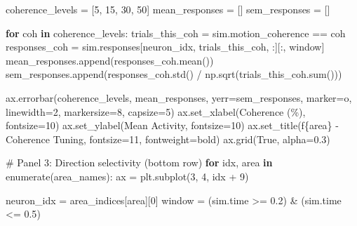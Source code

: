 \documentclass[
  11pt,
  letterpaper,
  oneside,
  openany]{book}
\newenvironment{Shaded}{\begin{snugshade}}{\end{snugshade}}
\newcommand{\BuiltInTok}[1]{\textcolor[rgb]{0.00,0.23,0.31}{#1}}
\newcommand{\CommentTok}[1]{\textcolor[rgb]{0.37,0.37,0.37}{#1}}
\newcommand{\ControlFlowTok}[1]{\textcolor[rgb]{0.00,0.23,0.31}{\textbf{#1}}}
\newcommand{\DecValTok}[1]{\textcolor[rgb]{0.68,0.00,0.00}{#1}}
\newcommand{\FloatTok}[1]{\textcolor[rgb]{0.68,0.00,0.00}{#1}}
\newcommand{\KeywordTok}[1]{\textcolor[rgb]{0.00,0.23,0.31}{\textbf{#1}}}
\newcommand{\NormalTok}[1]{\textcolor[rgb]{0.00,0.23,0.31}{#1}}
\newcommand{\OperatorTok}[1]{\textcolor[rgb]{0.37,0.37,0.37}{#1}}
\newcommand{\SpecialCharTok}[1]{\textcolor[rgb]{0.37,0.37,0.37}{#1}}
\newcommand{\SpecialStringTok}[1]{\textcolor[rgb]{0.13,0.47,0.30}{#1}}
\newcommand{\StringTok}[1]{\textcolor[rgb]{0.13,0.47,0.30}{#1}}
\newcommand{\VariableTok}[1]{\textcolor[rgb]{0.07,0.07,0.07}{#1}}
\begin{document}
\begin{Shaded}
\begin{Highlighting}[]
\NormalTok{    coherence\_levels }\OperatorTok{=}\NormalTok{ [}\DecValTok{5}\NormalTok{, }\DecValTok{15}\NormalTok{, }\DecValTok{30}\NormalTok{, }\DecValTok{50}\NormalTok{]}
\NormalTok{    mean\_responses }\OperatorTok{=}\NormalTok{ []}
\NormalTok{    sem\_responses }\OperatorTok{=}\NormalTok{ []}
    
    \ControlFlowTok{for}\NormalTok{ coh }\KeywordTok{in}\NormalTok{ coherence\_levels:}
\NormalTok{        trials\_this\_coh }\OperatorTok{=}\NormalTok{ sim.motion\_coherence }\OperatorTok{==}\NormalTok{ coh}
\NormalTok{        responses\_coh }\OperatorTok{=}\NormalTok{ sim.responses[neuron\_idx, trials\_this\_coh, :][:, window]}
\NormalTok{        mean\_responses.append(responses\_coh.mean())}
\NormalTok{        sem\_responses.append(responses\_coh.std() }\OperatorTok{/}\NormalTok{ np.sqrt(trials\_this\_coh.}\BuiltInTok{sum}\NormalTok{()))}
    
\NormalTok{    ax.errorbar(coherence\_levels, mean\_responses, yerr}\OperatorTok{=}\NormalTok{sem\_responses,}
\NormalTok{               marker}\OperatorTok{=}\StringTok{\textquotesingle{}o\textquotesingle{}}\NormalTok{, linewidth}\OperatorTok{=}\DecValTok{2}\NormalTok{, markersize}\OperatorTok{=}\DecValTok{8}\NormalTok{, capsize}\OperatorTok{=}\DecValTok{5}\NormalTok{)}
\NormalTok{    ax.set\_xlabel(}\StringTok{\textquotesingle{}Coherence (\%)\textquotesingle{}}\NormalTok{, fontsize}\OperatorTok{=}\DecValTok{10}\NormalTok{)}
\NormalTok{    ax.set\_ylabel(}\StringTok{\textquotesingle{}Mean Activity\textquotesingle{}}\NormalTok{, fontsize}\OperatorTok{=}\DecValTok{10}\NormalTok{)}
\NormalTok{    ax.set\_title(}\SpecialStringTok{f\textquotesingle{}}\SpecialCharTok{\{}\NormalTok{area}\SpecialCharTok{\}}\SpecialStringTok{ {-} Coherence Tuning\textquotesingle{}}\NormalTok{, fontsize}\OperatorTok{=}\DecValTok{11}\NormalTok{, fontweight}\OperatorTok{=}\StringTok{\textquotesingle{}bold\textquotesingle{}}\NormalTok{)}
\NormalTok{    ax.grid(}\VariableTok{True}\NormalTok{, alpha}\OperatorTok{=}\FloatTok{0.3}\NormalTok{)}

\CommentTok{\# Panel 3: Direction selectivity (bottom row)}
\ControlFlowTok{for}\NormalTok{ idx, area }\KeywordTok{in} \BuiltInTok{enumerate}\NormalTok{(area\_names):}
\NormalTok{    ax }\OperatorTok{=}\NormalTok{ plt.subplot(}\DecValTok{3}\NormalTok{, }\DecValTok{4}\NormalTok{, idx }\OperatorTok{+} \DecValTok{9}\NormalTok{)}
    
\NormalTok{    neuron\_idx }\OperatorTok{=}\NormalTok{ area\_indices[area][}\DecValTok{0}\NormalTok{]}
\NormalTok{    window }\OperatorTok{=}\NormalTok{ (sim.time }\OperatorTok{\textgreater{}=} \FloatTok{0.2}\NormalTok{) }\OperatorTok{\&}\NormalTok{ (sim.time }\OperatorTok{\textless{}=} \FloatTok{0.5}\NormalTok{)}
    

\end{Highlighting}
\end{Shaded}
\end{document}
